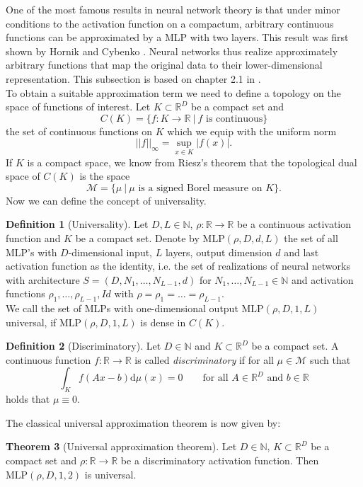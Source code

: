 \documentclass[11pt,titlepage]{article}
\newcommand{\R}{\mathbb{R}} %
\newcommand{\N}{\mathbb{N}} %
\newcommand{\abs}[1]{{\left| #1 \right|}}
\theoremstyle{definition}
\newtheorem{theorem}{Theorem}[section]
\newtheorem{definition}[theorem]{Definition}
\theoremstyle{remark}
\begin{document}
	One of the most famous results in neural network theory is that under minor conditions to the activation function on a compactum, arbitrary continuous functions can be approximated by a MLP 
	with two layers. This result was first shown by Hornik \cite{Hornik1989} and Cybenko \cite{Cybenko1989}. Neural networks thus realize approximately arbitrary functions that map the original data to their lower-dimensional representation. This subsection is based on chapter 2.1 in \cite{Petersen2022}. \\
	To obtain a suitable approximation term we need to define a topology on the space of functions of interest. Let $K\subset \R^D$ be a compact set and 
	\[C(K) = \{f:K\to \R \ \vert\  f\text{ is continuous}\}\]
	the set of continuous functions on $K$ which we equip with the uniform norm
	\[\abs{\abs{f}}_\infty = \sup_{x\in K} \abs{f(x)}.\]
	If $K$ is a compact space, we know from Riesz's theorem that the topological dual space of $C(K)$ is the space
	\[\mathscr{M} = \{\mu\ \vert\  \mu\text{ is a signed Borel measure on }K\}.\]
	Now we can define the concept of universality.
	\begin{definition}[Universality]
		Let $D,L\in\N$, $\rho :\R\to\R$ be a continuous activation function and $K$ be a 
		compact set. Denote by $\mathrm{MLP}(\rho, D, d, L)$ the set of all MLP's with 
		$D$-dimensional input, $L$ layers, output dimension $d$ and 
		last activation function as the identity, i.e. 
		the set of realizations of neural networks with architecture 
		$S = (D, N_1, \ldots, N_{L-1}, d)$ for $N_1,\ldots, N_{L-1}\in\N$ and 
		activation functions $\rho_1,\ldots,\rho_{L-1}, Id$ with $\rho =\rho_1=\ldots=\rho_{L-1}$. \\
		We call the set of MLPs with one-dimensional output $\mathrm{MLP}(\rho, D, 1, L)$ universal, if $\mathrm{MLP}(\rho, D, 1, L)$ is 
		dense in $C(K)$.
	\end{definition}
	
	\begin{definition}[Discriminatory]
		Let $D\in\N$ and $K\subset\R^D$ be a compact set. A continuous function 
		$f:\R\to\R$ is called \textsl{discriminatory} if for all $\mu\in\mathscr{M}$ 
		such that
		\[\int_K f(Ax -b)\mathrm{d}\mu(x) = 0 \qquad \text{for all $A\in\R^D$ and $b\in\R$}\]
		holds that $\mu \equiv 0$.
	\end{definition}
	
	The classical universal approximation theorem is now given by:
	
	\begin{theorem}[Universal approximation theorem]
		Let $D\in\N$, $K\subset\R^D$ be a compact set and $\rho:\R\to\R$ be a 
		discriminatory activation function. Then $\mathrm{MLP}(\rho, D, 1, 2)$ is universal.
	\end{theorem}
	
\end{document}
